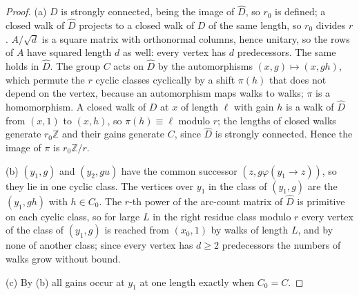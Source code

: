 \begin{proof}
(a) $D$ is strongly connected, being the image of $\hat D$, so $r_0$ is defined; a closed walk of $\hat D$ projects to a closed walk of $D$ of the same length, so $r_0$ divides $r$. $A/\sqrt d$ is a square matrix with orthonormal columns, hence unitary, so the rows of $A$ have squared length $d$ as well: every vertex has $d$ predecessors. The same holds in $\hat D$. The group $C$ acts on $\hat D$ by the automorphisms $(x,g)\mapsto(x,gh)$, which permute the $r$ cyclic classes cyclically by a shift $\pi(h)$ that does not depend on the vertex, because an automorphism maps walks to walks; $\pi$ is a homomorphism. A closed walk of $D$ at $x$ of length $\ell$ with gain $h$ is a walk of $\hat D$ from $(x,1)$ to $(x,h)$, so $\pi(h)\equiv\ell$ modulo $r$; the lengths of closed walks generate $r_0\mathbb{Z}$ and their gains generate $C$, since $\hat D$ is strongly connected. Hence the image of $\pi$ is $r_0\mathbb{Z}/r$.

(b) $(y_1,g)$ and $(y_2,gu)$ have the common successor $(z,g\varphi(y_1\to z))$, so they lie in one cyclic class. The vertices over $y_1$ in the class of $(y_1,g)$ are the $(y_1,gh)$ with $h\in C_0$. The $r$-th power of the arc-count matrix of $\hat D$ is primitive on each cyclic class, so for large $L$ in the right residue class modulo $r$ every vertex of the class of $(y_1,g)$ is reached from $(x_0,1)$ by walks of length $L$, and by none of another class; since every vertex has $d\ge2$ predecessors the numbers of walks grow without bound.

(c) By (b) all gains occur at $y_1$ at one length exactly when $C_0=C$.
\end{proof}

